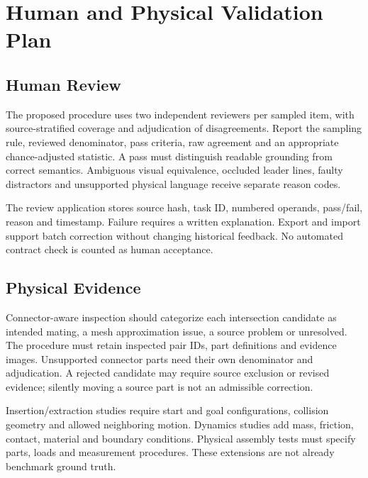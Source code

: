 \documentclass[10pt,letterpaper]{article}
\begin{document}
\section{Human and Physical Validation Plan}
\subsection{Human Review}
The proposed procedure uses two independent reviewers per sampled
item, with source-stratified coverage and adjudication of disagreements.
Report the sampling rule, reviewed denominator, pass criteria, raw
agreement and an appropriate chance-adjusted statistic. A pass must
distinguish readable grounding from correct semantics. Ambiguous
visual equivalence, occluded leader lines, faulty distractors and
unsupported physical language receive separate reason codes.

The review application stores source hash, task ID, numbered operands,
pass/fail, reason and timestamp. Failure requires a written explanation.
Export and import support batch correction without changing historical
feedback. No automated contract check is counted as human acceptance.

\begin{table}[h]
\centering\small
\caption{Unrun human assessment. Pool sizes are known.
Reviewed is a count; Pass and Agree are percentages over declared
denominators; Time is median seconds per reviewed unit.}

\end{table}

\subsection{Physical Evidence}
Connector-aware inspection should categorize each intersection
candidate as intended mating, a mesh approximation issue, a source
problem or unresolved. The procedure must retain inspected pair IDs,
part definitions and evidence images. Unsupported connector parts need
their own denominator and adjudication. A rejected candidate may
require source exclusion or revised evidence; silently moving a source
part is not an admissible correction.

Insertion/extraction studies require start and goal configurations,
collision geometry and allowed neighboring motion. Dynamics studies
add mass, friction, contact, material and boundary conditions.
Physical assembly tests must specify parts, loads and measurement
procedures. These extensions are not already benchmark ground truth.
\end{document}
